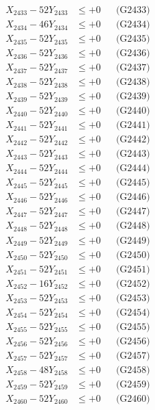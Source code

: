 \documentclass[a4paper,10pt]{article}
\begin{document}
{\begin{align}
X_{2433} - 52Y_{2433} &\leq +0 && \text{(G2433)} \\
X_{2434} - 46Y_{2434} &\leq +0 && \text{(G2434)} \\
X_{2435} - 52Y_{2435} &\leq +0 && \text{(G2435)} \\
X_{2436} - 52Y_{2436} &\leq +0 && \text{(G2436)} \\
X_{2437} - 52Y_{2437} &\leq +0 && \text{(G2437)} \\
X_{2438} - 52Y_{2438} &\leq +0 && \text{(G2438)} \\
X_{2439} - 52Y_{2439} &\leq +0 && \text{(G2439)} \\
X_{2440} - 52Y_{2440} &\leq +0 && \text{(G2440)} \\
\allowbreak
X_{2441} - 52Y_{2441} &\leq +0 && \text{(G2441)} \\
X_{2442} - 52Y_{2442} &\leq +0 && \text{(G2442)} \\
X_{2443} - 52Y_{2443} &\leq +0 && \text{(G2443)} \\
X_{2444} - 52Y_{2444} &\leq +0 && \text{(G2444)} \\
X_{2445} - 52Y_{2445} &\leq +0 && \text{(G2445)} \\
X_{2446} - 52Y_{2446} &\leq +0 && \text{(G2446)} \\
X_{2447} - 52Y_{2447} &\leq +0 && \text{(G2447)} \\
X_{2448} - 52Y_{2448} &\leq +0 && \text{(G2448)} \\
X_{2449} - 52Y_{2449} &\leq +0 && \text{(G2449)} \\
X_{2450} - 52Y_{2450} &\leq +0 && \text{(G2450)} \\
\allowbreak
X_{2451} - 52Y_{2451} &\leq +0 && \text{(G2451)} \\
X_{2452} - 16Y_{2452} &\leq +0 && \text{(G2452)} \\
X_{2453} - 52Y_{2453} &\leq +0 && \text{(G2453)} \\
X_{2454} - 52Y_{2454} &\leq +0 && \text{(G2454)} \\
X_{2455} - 52Y_{2455} &\leq +0 && \text{(G2455)} \\
X_{2456} - 52Y_{2456} &\leq +0 && \text{(G2456)} \\
X_{2457} - 52Y_{2457} &\leq +0 && \text{(G2457)} \\
X_{2458} - 48Y_{2458} &\leq +0 && \text{(G2458)} \\
X_{2459} - 52Y_{2459} &\leq +0 && \text{(G2459)} \\
X_{2460} - 52Y_{2460} &\leq +0 && \text{(G2460)} \\

\end{align}}
\end{document}
